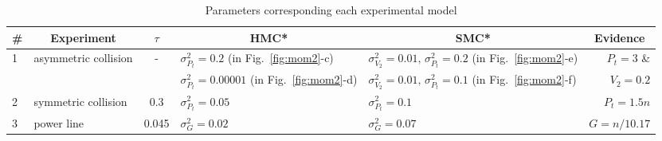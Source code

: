 \documentclass[]{article}
\begin{document}
\begin{table}[t]
\footnotesize
\caption{Parameters corresponding each experimental model}
\label{t:parameters}
\centering
\begin{tabular}{l l c l l r}
\toprule
\# &\multicolumn{1}{c}{Experiment}  &\multicolumn{1}{c}{$\tau$} &\multicolumn{1}{c}{HMC*} &\multicolumn{1}{c}{SMC*} &\multicolumn{1}{c}{Evidence}\\
\midrule
1 & asymmetric collision		& -   & $\sigma^2_{P_t} = 0.2$         (in Fig.~\ref{fig:mom2}-c)         & $\sigma^2_{V_2} = 0.01, \, \sigma^2_{P_t} = 0.2$ (in Fig.~\ref{fig:mom2}-e) &$P_t = 3$ \& \\
   &			   & 	   & $\sigma^2_{P_t} = 0.00001$ (in Fig.~\ref{fig:mom2}-d)         & $\sigma^2_{V_2} = 0.01, \, \sigma^2_{P_t} = 0.1$ (in Fig.~\ref{fig:mom2}-f) & $V_2 = 0.2$\\
2 & symmetric collision 		& 0.3     & $\sigma^2_{P_t} = 0.05$ & $\sigma^2_{P_t} = 0.1$ & $P_t = 1.5n$\\
3 & power line				& 0.045 & $\sigma^2_{G} = 0.02$    &$\sigma^2_{G} = 0.07$   & $G = n/10.17$ \\
\bottomrule
\end{tabular}
\end{table}


\end{document}
